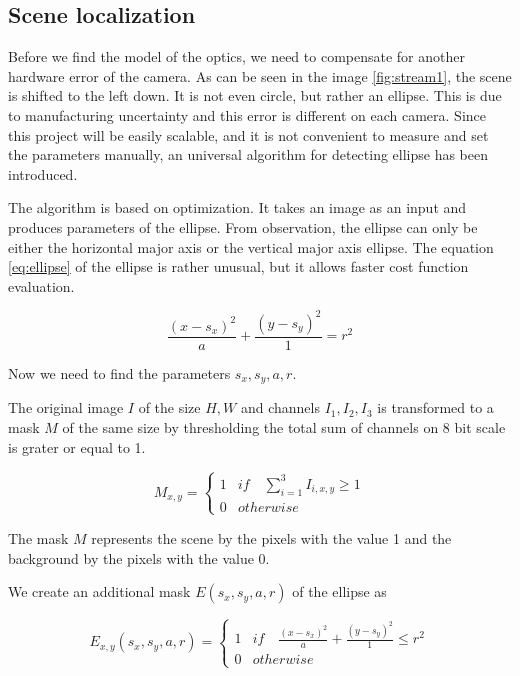 \documentclass[a4paper,12pt,titlepage, twoside]{article}
\numberwithin{figure}{section}
\begin{document}
\subsection{Scene localization}
\label{sec:scene_localization}
Before we find the model of the optics, we need to compensate for another hardware error of the camera. As can be seen in the image \ref{fig:stream1}, the scene is shifted to the left down. It is not even circle, but rather an ellipse. This is due to manufacturing uncertainty and this error is different on each camera. Since this project will be easily scalable, and it is not convenient to measure and set the parameters manually, an universal algorithm for detecting ellipse has been introduced.

The algorithm is based on optimization. It takes an image as an input and produces parameters of the ellipse. From observation, the ellipse can only be either the horizontal major axis or the vertical major axis ellipse. The equation \ref{eq:ellipse} of the ellipse is rather unusual, but it allows faster cost function evaluation.

\begin{equation}
\label{eq:ellipse}
\frac{(x-s_x)^2}{a} + \frac{(y-s_y)^2}{1} = r^2
\end{equation}

Now we need to find the parameters $s_x, s_y, a, r$.

The original image $I$ of the size $H, W$ and channels $I_1, I_2, I_3$ is transformed to a mask $M$ of the same size by thresholding the total sum of channels on 8 bit scale is grater or equal to 1. \cite{lukacs1997real}

\begin{equation*}
M_{x,y} = \begin{cases}
1 & if \quad \sum_{i=1}^{3} I_{i,x,y} \geq 1 \\
0 & otherwise
\end{cases}
\end{equation*}

The mask $M$ represents the scene by the pixels with the value 1 and the background by the pixels with the value 0. 

We create an additional mask $E(s_x, s_y, a, r)$ of the ellipse as 

\begin{equation*}
E_{x,y}(s_x, s_y, a, r) = \begin{cases}
1 & if \quad \frac{(x-s_x)^2}{a} + \frac{(y-s_y)^2}{1} \leq r^2 \\
0 & otherwise
\end{cases}
\end{equation*}
\end{document}
